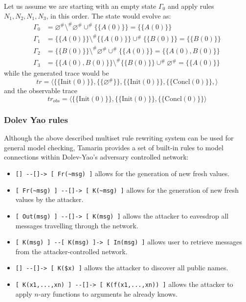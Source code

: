 \documentclass[fleqn,10pt]{SelfArx} %
\begin{document}
Let us assume we are starting with an empty state $\Gamma_0$ and apply rules $N_1, N_2, N_1, N_3$, in this order. The state would evolve as:
\begin{align*}
    \Gamma_0 &= \varnothing^{\#} \setminus^{\#} \varnothing^{\#} \cup^{\#} \{\{A(0)\}\} = \{\{A(0)\}\}\\
    \Gamma_1 &= \{\{A(0)\}\} \setminus^{\#} \{\{A(0)\}\} \cup^{\#} \{\{B(0)\}\} = \{\{B(0)\}\}\\
    \Gamma_2 &= \{\{B(0)\}\} \setminus^{\#} \varnothing^{\#} \cup^{\#} \{\{A(0)\}\} = \{\{A(0), B(0)\}\}\\
    \Gamma_3 &= \{\{A(0), B(0)\}\} \setminus^{\#} \{\{B(0)\}\} \cup^{\#} \varnothing^{\#} = \{\{A(0)\}\}
\end{align*}
while the generated trace would be
\begin{equation*}
    tr = \langle \{\{\textrm{Init}(0)\}\}, \{\{\varnothing^{\#}\}\}, \{\{\textrm{Init}(0)\}\}, \{\{\textrm{Concl}(0)\}\},\rangle
\end{equation*}
and the observable trace
\begin{equation*}
    tr_{obs} = \langle \{\{\textrm{Init}(0)\}\}, \{\{\textrm{Init}(0)\}\}, \{\{\textrm{Concl}(0)\}\}\rangle
\end{equation*}

\subsubsection{Dolev Yao rules}
Although the above described multiset rule rewriting system can be used for general model checking, Tamarin provides a set of built-in rules to model connections within Dolev-Yao's adversary controlled network:

\begin{itemize}
    \item \lstinline|[] --[]-> [ Fr(~msg) ]| allows for the generation of new fresh values.
    \item \lstinline|[ Fr(~msg) ] --[]-> [ K(~msg) ]| allows for the generation of new fresh values by the attacker.
    \item \lstinline|[ Out(msg) ] --[]-> [ K(msg) ]| allows the attacker to eavesdrop all messages travelling through the network. 
    \item \lstinline|[ K(msg) ] --[ K(msg) ]-> [ In(msg) ]| allows user to retrieve messages from the attacker-controlled network.
    \item \lstinline|[] --[]-> [ K($x) ]| allows the attacker to discover all public names.
    \item \lstinline|[ K(x1,...,xn) ] --[]-> [ K(f(x1,...,xn)) ]| allows the attacker to apply $n$-ary functions to arguments he already knows.
\end{itemize}
\end{document}
